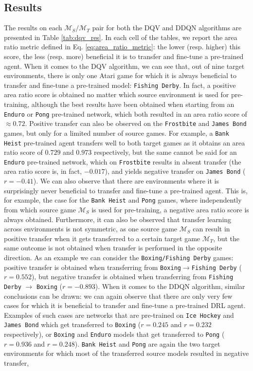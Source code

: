 \subsection{Results}
\label{sec:results_1}

The results on each $\mathcal{M}_S/\mathcal{M}_T$ pair for both the DQV and DDQN algorithms are presented in Table \ref{tab:dqv_res}. In each cell of the tables, we report the area ratio metric defined in Eq. \ref{eq:area_ratio_metric}: the lower (resp. higher) this score, the less (resp. more) beneficial it is to transfer and fine-tune a pre-trained agent. When it comes to the DQV algorithm, we can see that, out of nine target environments, there is only one Atari game for which it is always beneficial to transfer and fine-tune a pre-trained model: \texttt{Fishing Derby}. In fact, a positive area ratio score is obtained no matter which source environment is used for pre-training, although the best results have been obtained when starting from an \texttt{Enduro} or \texttt{Pong} pre-trained network, which both resulted in an area ratio score of $\approx 0.72$. Positive transfer can also be observed on the \texttt{Frostbite} and \texttt{James Bond} games, but only for a limited number of source games. For example, a \texttt{Bank Heist} pre-trained agent transfers well to both target games as it obtains an area ratio score of $0.729$ and $0.973$ respectively, but the same cannot be said for an \texttt{Enduro} pre-trained network, which on \texttt{Frostbite} results in absent transfer (the area ratio score is, in fact, $-0.017$), and yields negative transfer on \texttt{James Bond} ($r=-0.41$). We can also observe that there are environments where it is surprisingly never beneficial to transfer and fine-tune a pre-trained agent. This is, for example, the case for the \texttt{Bank Heist} and \texttt{Pong} games, where independently from which source game $\mathcal{M}_S$ is used for pre-training, a negative area ratio score is always obtained. Furthermore, it can also be observed that transfer learning across environments is not symmetric, as one source game $\mathcal{M}_S$ can result in positive transfer when it gets transferred to a certain target game $\mathcal{M}_T$, but the same outcome is not obtained when transfer is performed in the opposite direction. As an example we can consider the \texttt{Boxing/Fishing Derby} games: positive transfer is obtained when transferring from \texttt{Boxing}$\rightarrow$\texttt{Fishing Derby} ($r=0.552$), but negative transfer is obtained when transferring from \texttt{Fishing Derby} $\rightarrow$ \texttt{Boxing} ($r=-0.893$). When it comes to the DDQN algorithm, similar conclusions can be drawn: we can again observe that there are only very few cases for which it is beneficial to transfer and fine-tune a pre-trained DRL agent. Examples of such cases are networks that are pre-trained on \texttt{Ice Hockey} and \texttt{James Bond} which get transferred to \texttt{Boxing} ($r=0.245$ and $r=0.232$ respectively), or \texttt{Boxing} and \texttt{Enduro} models that get transferred to \texttt{Pong} ($r=0.936$ and $r=0.248$). \texttt{Bank Heist} and \texttt{Pong} are again the two target environments for which most of the transferred source models resulted in negative transfer, 